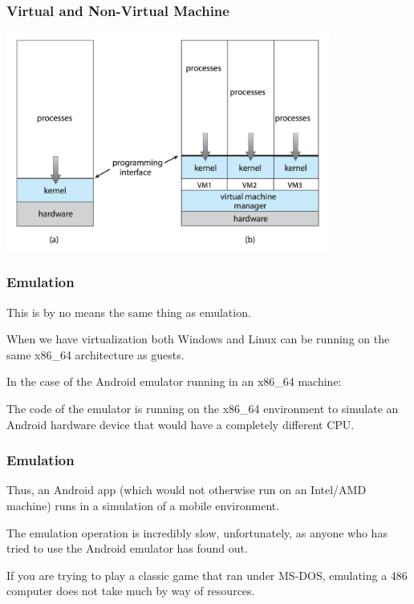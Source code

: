 \begin{frame}
\frametitle{Virtual and Non-Virtual Machine}

\begin{center}
	\includegraphics[width=0.8\textwidth]{images/non-virtual-machine.png}
\end{center}

\end{frame}

\begin{frame}
\frametitle{Emulation}

This is by no means the same thing as \alert{emulation}. 

When we have virtualization both Windows and Linux can be running on the same x86\_64 architecture as guests. 

In the case of the Android emulator running in an x86\_64 machine: 

The code of the emulator is running on the x86\_64 environment to simulate an Android hardware device that would have a completely different CPU. 

\end{frame}

\begin{frame}
\frametitle{Emulation}

Thus, an Android app (which would not otherwise run on an Intel/AMD machine) runs in a simulation of a mobile environment. 

The emulation operation is incredibly slow, unfortunately, as anyone who has tried to use the Android emulator has found out. 

If you are trying to play a classic game that ran under MS-DOS, emulating a 486 computer does not take much by way of resources.



\end{frame}

